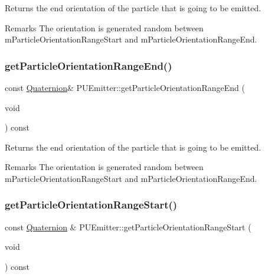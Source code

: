 Returns the end orientation of the particle that is going to be emitted. \begin{DoxyRemark}{Remarks}
The orientation is generated random between m\+Particle\+Orientation\+Range\+Start and m\+Particle\+Orientation\+Range\+End. 
\end{DoxyRemark}
\mbox{\label{classPUEmitter_ad7e34449d211958317bf8c2270b9631d}} 
\subsubsection{\texorpdfstring{get\+Particle\+Orientation\+Range\+End()}{getParticleOrientationRangeEnd()}\hspace{0.1cm}{\footnotesize\ttfamily [2/2]}}
{\footnotesize\ttfamily const \hyperlink{classQuaternion}{Quaternion}\& P\+U\+Emitter\+::get\+Particle\+Orientation\+Range\+End (\begin{DoxyParamCaption}\item[{void}]{ }\end{DoxyParamCaption}) const}

Returns the end orientation of the particle that is going to be emitted. \begin{DoxyRemark}{Remarks}
The orientation is generated random between m\+Particle\+Orientation\+Range\+Start and m\+Particle\+Orientation\+Range\+End. 
\end{DoxyRemark}
\mbox{\label{classPUEmitter_a6a75ac2d65a56cb29d8bca44d3381e29}} 
\subsubsection{\texorpdfstring{get\+Particle\+Orientation\+Range\+Start()}{getParticleOrientationRangeStart()}\hspace{0.1cm}{\footnotesize\ttfamily [1/2]}}
{\footnotesize\ttfamily const \hyperlink{classQuaternion}{Quaternion} \& P\+U\+Emitter\+::get\+Particle\+Orientation\+Range\+Start (\begin{DoxyParamCaption}\item[{void}]{ }\end{DoxyParamCaption}) const}

